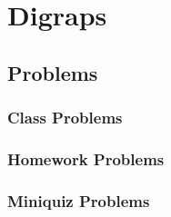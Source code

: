 \chapter{Digraps}
\coursecopyright


\section{Problems}

\subsection{Class Problems}
%
%
\clearpage

\subsection{Homework Problems}
%
\clearpage

\subsection{Miniquiz Problems}
\clearpage

\endinput